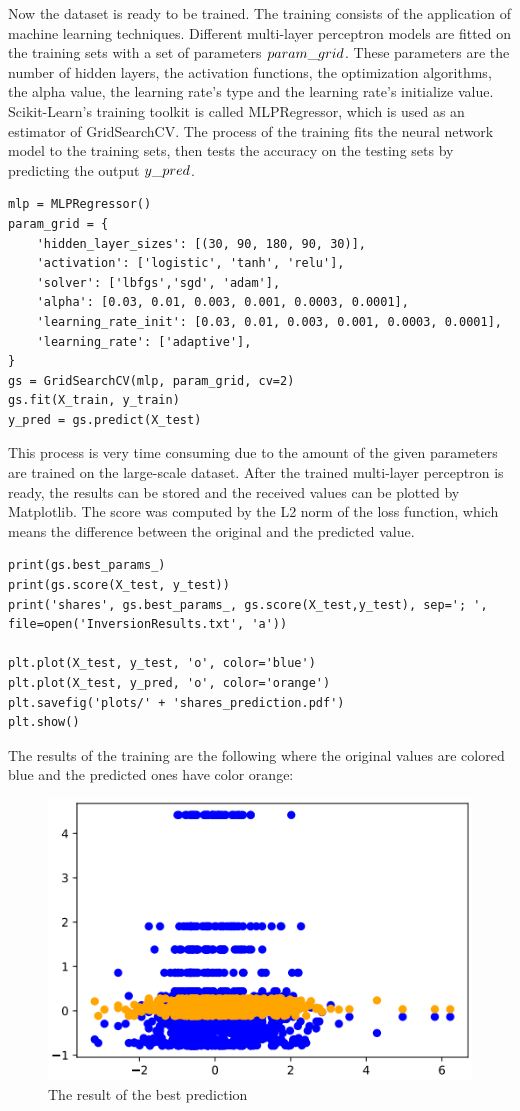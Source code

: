 Now the dataset is ready to be trained. The training consists of the application of machine learning techniques. Different multi-layer perceptron models are fitted on the training sets with a set of parameters $param\char`_grid$. These parameters are the number of hidden layers, the activation functions, the optimization algorithms, the alpha value, the learning rate's type and the learning rate's initialize value. Scikit-Learn's training toolkit is called MLPRegressor, which is used as an estimator of GridSearchCV. The process of the training fits the neural network model to the training sets, then tests the accuracy on the testing sets by predicting the output $y\char`_pred$.  
\begin{lstlisting}
mlp = MLPRegressor()
param_grid = {
	'hidden_layer_sizes': [(30, 90, 180, 90, 30)],
	'activation': ['logistic', 'tanh', 'relu'],
	'solver': ['lbfgs','sgd', 'adam'],
	'alpha': [0.03, 0.01, 0.003, 0.001, 0.0003, 0.0001],
	'learning_rate_init': [0.03, 0.01, 0.003, 0.001, 0.0003, 0.0001],
	'learning_rate': ['adaptive'],
}
gs = GridSearchCV(mlp, param_grid, cv=2)
gs.fit(X_train, y_train)
y_pred = gs.predict(X_test)
\end{lstlisting}
This process is very time consuming due to the amount of the given parameters are trained on the large-scale dataset. After the trained multi-layer perceptron is ready, the results can be stored and the
received values can be plotted by Matplotlib. The score was computed by the L2 norm of the loss function, which means the difference between the original and the predicted value.
\begin{lstlisting}
print(gs.best_params_)
print(gs.score(X_test, y_test))
print('shares', gs.best_params_, gs.score(X_test,y_test), sep='; ', file=open('InversionResults.txt', 'a'))

plt.plot(X_test, y_test, 'o', color='blue')
plt.plot(X_test, y_pred, 'o', color='orange')
plt.savefig('plots/' + 'shares_prediction.pdf')
plt.show()
\end{lstlisting}

\bigskip The results of the training are the following where the original values are colored blue and the predicted ones have color orange:
\begin{figure}[h]
	\centering
	\includegraphics[height=0.378\linewidth]{./figures/shares_prediction}
	\caption{The result of the best prediction}
	\label{fig:shares}
\end{figure}

